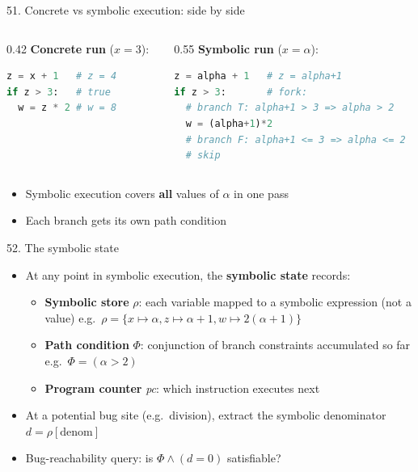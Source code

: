 \documentclass[aspectratio=169]{beamer}
\begin{document}
\begin{frame}[fragile]{51. Concrete vs symbolic execution: side by side}
\begin{columns}
\begin{column}{0.42\textwidth}
\textbf{Concrete run} (\(x=3\)):
\begin{lstlisting}[language=Python]
z = x + 1   # z = 4
if z > 3:   # true
  w = z * 2 # w = 8
\end{lstlisting}
\end{column}
\begin{column}{0.55\textwidth}
\textbf{Symbolic run} (\(x = \alpha\)):
\begin{lstlisting}[language=Python]
z = alpha + 1   # z = alpha+1
if z > 3:       # fork:
  # branch T: alpha+1 > 3 => alpha > 2
  w = (alpha+1)*2
  # branch F: alpha+1 <= 3 => alpha <= 2
  # skip
\end{lstlisting}
\end{column}
\end{columns}
\begin{itemize}
  \item Symbolic execution covers \textbf{all} values of \(\alpha\) in one pass
  \item Each branch gets its own path condition
\end{itemize}
\end{frame}

\begin{frame}{52. The symbolic state}
\begin{itemize}
  \item At any point in symbolic execution, the \textbf{symbolic state} records:
  \begin{itemize}
    \item \textbf{Symbolic store} \(\rho\): each variable mapped to a symbolic expression (not a value)
      e.g.\ \(\rho = \{x \mapsto \alpha, z \mapsto \alpha+1, w \mapsto 2(\alpha+1)\}\)
    \item \textbf{Path condition} \(\Phi\): conjunction of branch constraints accumulated so far
      e.g.\ \(\Phi = (\alpha > 2)\)
    \item \textbf{Program counter} \textit{pc}: which instruction executes next
  \end{itemize}
  \item At a potential bug site (e.g.\ division), extract the symbolic denominator \(d = \rho[\text{denom}]\)
  \item Bug-reachability query: is \(\Phi \wedge (d = 0)\) satisfiable?
\end{itemize}
\end{frame}
\end{document}
